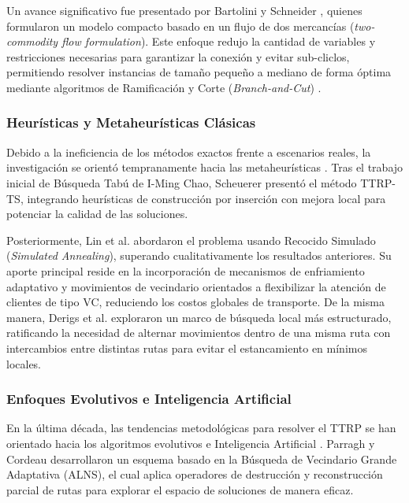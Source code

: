 \documentclass[letter, 10pt]{article}
\begin{document}
\vspace{0.3cm}

Un avance significativo fue presentado por Bartolini y Schneider \cite{bartolini2020two}, quienes formularon un modelo compacto basado en un flujo de dos mercanc\'ias (\textit{two-commodity flow formulation}).
Este enfoque redujo la cantidad de variables y restricciones necesarias para garantizar la conexi\'on y evitar sub-cliclos, permitiendo resolver instancias de tama\~no peque\~no a mediano de forma \'optima mediante algoritmos de Ramificaci\'on y Corte (\textit{Branch-and-Cut}) \cite{bartolini2020two}.


\subsubsection{Heur\'isticas y Metaheur\'isticas Cl\'asicas}
Debido a la ineficiencia de los m\'etodos exactos frente a escenarios reales, la investigaci\'on se orient\'o tempranamente hacia las metaheur\'isticas \cite{chao2002tabu,derigs2013model}. 
Tras el trabajo inicial de B\'usqueda Tab\'u de I-Ming Chao, Scheuerer \cite{scheuerer2006tabu} present\'o el m\'etodo TTRP-TS, integrando heur\'isticas de construcci\'on por inserci\'on con mejora local para potenciar la calidad de las soluciones.

\vspace{0.3cm}

Posteriormente, Lin et al. \cite{lin2009solving} abordaron el problema usando Recocido Simulado (\textit{Simulated Annealing}), superando cualitativamente los resultados anteriores.
Su aporte principal reside en la incorporaci\'on de mecanismos de enfriamiento adaptativo y movimientos de vecindario orientados a flexibilizar la atenci\'on de clientes de tipo VC, reduciendo los costos globales de transporte.
De la misma manera, Derigs et al. exploraron un marco de b\'usqueda local m\'as estructurado, ratificando la necesidad de alternar movimientos dentro de una misma ruta con intercambios entre distintas rutas para evitar el estancamiento en m\'inimos locales.

\subsubsection{Enfoques Evolutivos e Inteligencia Artificial}

En la \'ultima d\'ecada, las tendencias metodol\'ogicas para resolver el TTRP se han orientado hacia los algoritmos evolutivos e Inteligencia Artificial \cite{perez2023radial}. 
Parragh y Cordeau desarrollaron un esquema basado en la B\'usqueda de Vecindario Grande Adaptativa (ALNS), el cual aplica operadores de destrucci\'on y reconstrucci\'on parcial de rutas para explorar el espacio de soluciones de manera eficaz.
\end{document}
